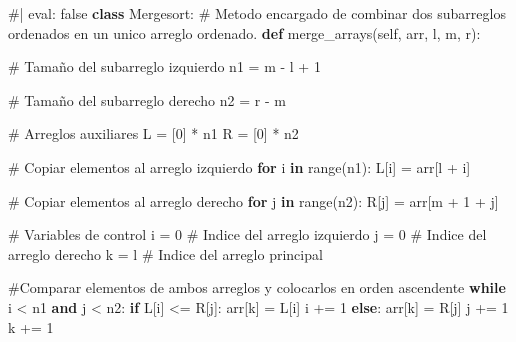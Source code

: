 \documentclass[
  spanish,
  letterpaper,
  DIV=11,
  numbers=noendperiod]{scrreprt}
\newenvironment{Shaded}{\begin{snugshade}}{\end{snugshade}}
\newcommand{\BuiltInTok}[1]{\textcolor[rgb]{0.00,0.23,0.31}{#1}}
\newcommand{\CommentTok}[1]{\textcolor[rgb]{0.37,0.37,0.37}{#1}}
\newcommand{\ControlFlowTok}[1]{\textcolor[rgb]{0.00,0.23,0.31}{\textbf{#1}}}
\newcommand{\DecValTok}[1]{\textcolor[rgb]{0.68,0.00,0.00}{#1}}
\newcommand{\KeywordTok}[1]{\textcolor[rgb]{0.00,0.23,0.31}{\textbf{#1}}}
\newcommand{\NormalTok}[1]{\textcolor[rgb]{0.00,0.23,0.31}{#1}}
\newcommand{\OperatorTok}[1]{\textcolor[rgb]{0.37,0.37,0.37}{#1}}
\newcommand{\VariableTok}[1]{\textcolor[rgb]{0.07,0.07,0.07}{#1}}
\begin{document}
\begin{Shaded}
\begin{Highlighting}[]
\CommentTok{\#| eval: false}
\KeywordTok{class}\NormalTok{ Mergesort:}
    \CommentTok{\# Metodo encargado de combinar dos subarreglos ordenados en un unico arreglo ordenado.}
    \KeywordTok{def}\NormalTok{ merge\_arrays(}\VariableTok{self}\NormalTok{, arr, l, m, r):}

        \CommentTok{\# Tamaño del subarreglo izquierdo}
\NormalTok{        n1 }\OperatorTok{=}\NormalTok{ m }\OperatorTok{{-}}\NormalTok{ l }\OperatorTok{+} \DecValTok{1}

        \CommentTok{\# Tamaño del subarreglo derecho}
\NormalTok{        n2 }\OperatorTok{=}\NormalTok{ r }\OperatorTok{{-}}\NormalTok{ m}

        \CommentTok{\# Arreglos auxiliares}
\NormalTok{        L }\OperatorTok{=}\NormalTok{ [}\DecValTok{0}\NormalTok{] }\OperatorTok{*}\NormalTok{ n1}
\NormalTok{        R }\OperatorTok{=}\NormalTok{ [}\DecValTok{0}\NormalTok{] }\OperatorTok{*}\NormalTok{ n2}

        \CommentTok{\# Copiar elementos al arreglo izquierdo}
        \ControlFlowTok{for}\NormalTok{ i }\KeywordTok{in} \BuiltInTok{range}\NormalTok{(n1):}
\NormalTok{            L[i] }\OperatorTok{=}\NormalTok{ arr[l }\OperatorTok{+}\NormalTok{ i]}

        \CommentTok{\# Copiar elementos al arreglo derecho}
        \ControlFlowTok{for}\NormalTok{ j }\KeywordTok{in} \BuiltInTok{range}\NormalTok{(n2):}
\NormalTok{            R[j] }\OperatorTok{=}\NormalTok{ arr[m }\OperatorTok{+} \DecValTok{1} \OperatorTok{+}\NormalTok{ j]}

        \CommentTok{\# Variables de control}
\NormalTok{        i }\OperatorTok{=} \DecValTok{0}   \CommentTok{\# Indice del arreglo izquierdo}
\NormalTok{        j }\OperatorTok{=} \DecValTok{0}   \CommentTok{\# Indice del arreglo derecho}
\NormalTok{        k }\OperatorTok{=}\NormalTok{ l   }\CommentTok{\# Indice del arreglo principal}
        
        \CommentTok{\#Comparar elementos de ambos arreglos y colocarlos en orden ascendente}
        \ControlFlowTok{while}\NormalTok{ i }\OperatorTok{\textless{}}\NormalTok{ n1 }\KeywordTok{and}\NormalTok{ j }\OperatorTok{\textless{}}\NormalTok{ n2:}
            \ControlFlowTok{if}\NormalTok{ L[i] }\OperatorTok{\textless{}=}\NormalTok{ R[j]:}
\NormalTok{                arr[k] }\OperatorTok{=}\NormalTok{ L[i]}
\NormalTok{                i }\OperatorTok{+=} \DecValTok{1}
            \ControlFlowTok{else}\NormalTok{:}
\NormalTok{                arr[k] }\OperatorTok{=}\NormalTok{ R[j]}
\NormalTok{                j }\OperatorTok{+=} \DecValTok{1}
\NormalTok{            k }\OperatorTok{+=} \DecValTok{1}
        

\end{Highlighting}
\end{Shaded}
\end{document}
